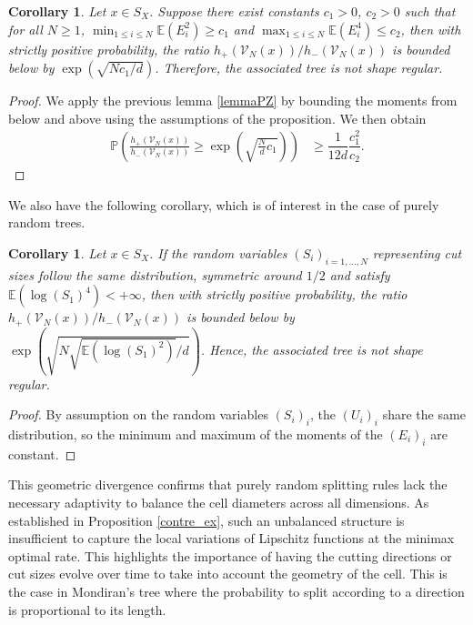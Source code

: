 \documentclass[paper=a4, fontsize=11pt]{scrartcl}
\newcommand{\PP}{\mathbb{P}}
\newcommand{\EE}{\mathbb{E}}
\newtheorem{corollary}[theorem]{Corollary}
\begin{document}
\begin{corollary}\label{cor_moments}
Let $x \in S_X$. Suppose there exist constants $c_1 > 0$, $c_2 > 0$ such that for all $N \geq 1$, $\min_{1 \leq i \leq N} \EE(E_i^2) \geq c_1$ and $\max_{1 \leq i \leq N} \mathbb{E}(E_i^4) \leq c_2$, then with strictly positive probability, the ratio $h_+(\mathcal V_N (x) ) / h_-(\mathcal V_N (x) )$ is bounded below by $\exp(\sqrt{N c_1 /{d}})$. Therefore, the associated tree is not shape regular.
\end{corollary}
\begin{proof}
We apply the previous lemma \ref{lemmaPZ} by bounding the moments from below and above using the assumptions of the proposition. We then obtain
    \begin{align*}
\PP\left(\frac{h_+(\mathcal V _ N (x) )}{h_-(\mathcal V_N  (x) )} 
\geq \exp\left(\sqrt{\frac{N}{d} c_1 } \right)\right) &\geq \dfrac{1}{12d} \dfrac{c_1^2}{c_2}.    
\end{align*}    
\end{proof}

We also have the following corollary, which is of interest in the case of purely random trees.

\begin{corollary}\label{cor_PRT}
Let $x \in S_X$. If the random variables $(S_i)_{i=1,\dots,N}$ representing cut sizes follow the same distribution, symmetric around $1/2$ and satisfy $\mathbb{E}(\log(S_1)^4) < + \infty$, then with strictly positive probability, the ratio $h_+(\mathcal{V}_N(x)) / h_-(\mathcal{V}_N(x))$ is bounded below by $\exp\left( \sqrt{N \sqrt{\mathbb{E}(\log(S_1)^2)} / d} \right)$. Hence, the associated tree is not shape regular.
\end{corollary}
\begin{proof}
    By assumption on the random variables $(S_i)_i$, the $(U_i)_i$ share the same distribution, so the minimum and maximum of the moments of the $(E_i)_i$ are constant.
\end{proof}

This geometric divergence confirms that purely random splitting rules lack the necessary adaptivity to balance the cell diameters across all dimensions. As established in Proposition \ref{contre_ex}, such an unbalanced structure is insufficient to capture the local variations of Lipschitz functions at the minimax optimal rate. This highlights the importance of having the cutting directions or cut sizes evolve over time to take into account the geometry of the cell. This is the case in Mondiran's tree where the probability to split according to a direction is proportional to its length.
\end{document}
